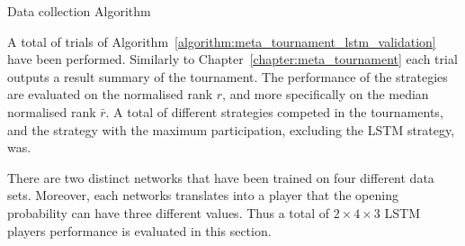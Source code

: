 
\begin{algorithm}[!htbp]
    \;
    \caption{Data collection Algorithm}
    \label{algorithm:meta_tournament_lstm_validation}
\end{algorithm}

\begin{table}[!htbp]
    \begin{center}
    \end{center}
    \caption{Data collection; parameters' values}
    \label{table:parameters_values}
\end{table}

A total of \metatournamentslstm trials of
Algorithm~\ref{algorithm:meta_tournament_lstm_validation} have been performed.
Similarly to Chapter~\ref{chapter:meta_tournament} each trial outputs a result
summary of the tournament. The performance of the strategies are evaluated on
the normalised rank \(r\), and more specifically on the median normalised rank
\(\bar{r}\). A total of different strategies competed in the tournaments, and
the strategy with the maximum participation, excluding the LSTM strategy, was.

There are two distinct networks that have been trained on four different data
sets. Moreover, each networks translates into a player that the opening
probability can have three different values. Thus a total of $2 \times 4 \times
3$ LSTM players performance is evaluated in this section.

